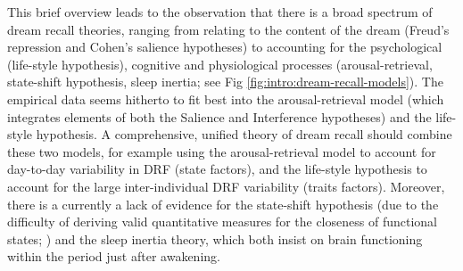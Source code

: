 This brief overview leads to the observation that there is a broad spectrum of dream recall theories, ranging from relating to the content of the dream (Freud’s repression and Cohen’s salience hypotheses) to accounting for the psychological (life-style hypothesis), cognitive and physiological processes (arousal-retrieval,  state-shift hypothesis, sleep inertia; see Fig \ref{fig:intro:dream-recall-models}). The empirical data seems hitherto to fit best into the arousal-retrieval model (which integrates elements of both the Salience and Interference hypotheses) and the life-style hypothesis. A comprehensive, unified theory of dream recall should combine these two models, for example using the arousal-retrieval model to account for day-to-day variability in DRF (state factors), and the life-style hypothesis to account for the large inter-individual DRF variability (traits factors). Moreover, there is a currently a lack of evidence for the state-shift hypothesis (due to the difficulty of deriving valid quantitative measures for the closeness of functional states; \citealp{schredl_dream_1999}) and the sleep inertia theory, which both insist on brain functioning within the period just after awakening.

